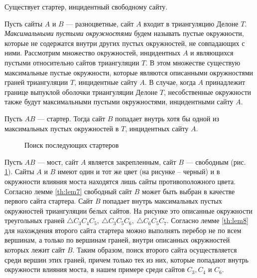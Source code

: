 \documentclass[12pt]{article}
\begin{document}
\begin{lemma}
\label{th:lem7}
Существует стартер, инцидентный свободному сайту.
\end{lemma}

Пусть сайты $A$ и $B$ --- разноцветные, сайт $A$ входит в триангуляцию Делоне $T$.
{\itshape Максимальными пустыми окружностями} будем называть пустые окружности,
которые не содержатся внутри других пустых окружностей, не совпадающих с ними.
Рассмотрим множество окружностей, инцидентных $A$ и являющихся пустыми относительно сайтов триангуляции $T$.
В этом множестве существую максимальные пустые окружности, которые являются описанными окружностями граней триангуляции $T$,
инцидентные сайту $A$. 
В случае, когда $A$ принадлежит границе выпуклой оболочки триангуляции Делоне $T$,
несобственные окружности также будут максимальными пустыми окружностями, инцидентными сайту $A$.

\begin{lemma}
\label{th:lem8}
Пусть $AB$ --- стартер. Тогда сайт $B$ попадает внутрь хотя бы одной из максимальных пустых окружностей в $T$, инцидентных сайту $A$.
\end{lemma}

\begin{figure}[htb!]
	\caption{Поиск последующих стартеров}
	\label{pic:nextStarter}
\end{figure}

Пусть $AB$ --- мост, сайт $A$ является закрепленным, сайт $B$ --- свободным (рис. \ref{pic:nextStarter}).
Сайты $A$ и $B$ имеют один и тот же цвет (на рисунке – черный) и в окружности влияния моста находятся лишь сайты противоположного цвета.
Согласно лемме \ref{th:lem7} свободный сайт $B$ может быть выбран в качестве первого сайта стартера.
Сайт $B$ попадает внутрь максимальных пустых окружностей триангуляции белых сайтов.
На рисунке это описанные окружности треугольных граней $\triangle C_3C_4C_5,~\triangle C_3C_5C_6,~\triangle C_6C_5C_7$.
Согласно лемме \ref{th:lem8} для нахождения второго сайта стартера можно выполнять перебор не по всем вершинам,
а только по вершинам граней, внутри описанных окружностей которых лежит сайт $B$.
Таким образом, поиск второго сайта осуществляется среди вершин этих граней,
причем только тех из них, которые попадают внутрь окружности влияния моста,
в нашем примере среди сайтов $C_3, C_4$ и $C_6$.
\end{document}
